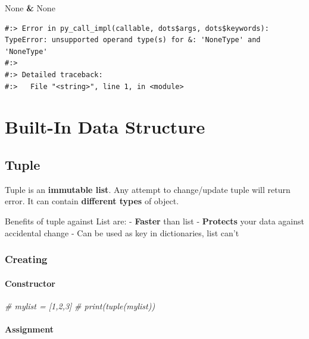 \documentclass[
]{book}
\newenvironment{Shaded}{\begin{snugshade}}{\end{snugshade}}
\newcommand{\CommentTok}[1]{\textcolor[rgb]{0.37,0.37,0.37}{\textit{#1}}}
\newcommand{\OperatorTok}[1]{\textcolor[rgb]{0.43,0.43,0.43}{\textbf{#1}}}
\newcommand{\VariableTok}[1]{\textcolor[rgb]{0,0,0}{#1}}
\begin{document}
\begin{Shaded}
\begin{Highlighting}[]
\VariableTok{None} \OperatorTok{&} \VariableTok{None}
\end{Highlighting}
\end{Shaded}

\begin{verbatim}
#:> Error in py_call_impl(callable, dots$args, dots$keywords): TypeError: unsupported operand type(s) for &: 'NoneType' and 'NoneType'
#:> 
#:> Detailed traceback: 
#:>   File "<string>", line 1, in <module>
\end{verbatim}

\hypertarget{built-in-data-structure}{%
\chapter{Built-In Data Structure}\label{built-in-data-structure}}

\hypertarget{tuple}{%
\section{Tuple}\label{tuple}}

Tuple is an \textbf{immutable list}. Any attempt to change/update tuple will return error. It can contain \textbf{different types} of object.

Benefits of tuple against List are: - \textbf{Faster} than list - \textbf{Protects} your data against accidental change - Can be used as key in dictionaries, list can't

\hypertarget{creating}{%
\subsection{Creating}\label{creating}}

\hypertarget{constructor-1}{%
\subsubsection{Constructor}\label{constructor-1}}

\begin{Shaded}
\begin{Highlighting}[]
\CommentTok{# mylist = [1,2,3]}
\CommentTok{# print(tuple(mylist))}
\end{Highlighting}
\end{Shaded}

\hypertarget{assignment-1}{%
\subsubsection{Assignment}\label{assignment-1}}
\end{document}

